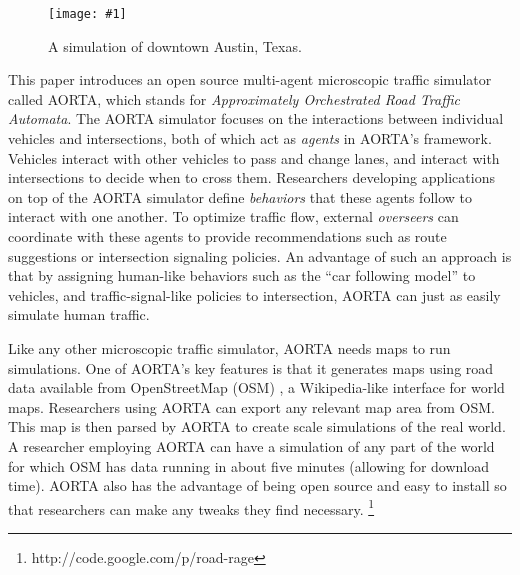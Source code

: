 \documentclass[letterpaper, 10 pt, conference]{ieeeconf}  %
\newcommand{\pix}[3]{
  \begin{figure}[h]
    \centering \texttt{[image: \#1]}
    \caption{#2}
  \end{figure}
}
\begin{document}


\pix{downtown_atx.png}{A simulation of downtown Austin, Texas.}{scale=0.25}

This paper introduces an open source multi-agent microscopic traffic
simulator called AORTA, which stands for \textit{Approximately
Orchestrated Road Traffic Automata}. The AORTA simulator focuses on
the interactions between individual vehicles and intersections, both
of which act as \textit{agents} in AORTA's framework. Vehicles
interact with other vehicles to pass and change lanes, and interact
with intersections to decide when to cross them. Researchers
developing applications on top of the AORTA simulator define
\textit{behaviors} that these agents follow to interact with one
another. To optimize traffic flow, external \textit{overseers} can
coordinate with these agents to provide recommendations such as route
suggestions or intersection signaling policies.  An advantage of such
an approach is that by assigning human-like behaviors such as the
``car following model'' \cite{brackstone1999car} to vehicles, and
traffic-signal-like policies to intersection, AORTA can just as easily
simulate human traffic.

Like any other microscopic traffic simulator, AORTA needs maps to run
simulations. One of AORTA's key features is that it generates maps using road data available from OpenStreetMap
(OSM) \cite{osm}, a Wikipedia-like interface for world maps. Researchers using
AORTA can export any relevant map area from OSM. This map is then parsed by AORTA to
create scale simulations of the real world. A researcher employing AORTA can have a simulation
of any part of the world for which OSM has data running in about five minutes
(allowing for download time).  AORTA also has the advantage of being open source and
easy to install so that researchers can make any tweaks they find necessary.
\footnote{http://code.google.com/p/road-rage}


\end{document}
